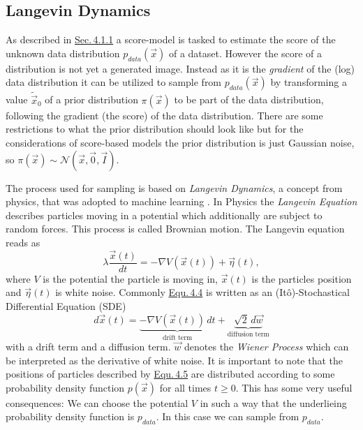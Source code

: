 \subsection{Langevin Dynamics} \label{sec:4.1.2}
As described in \hyperref[sec:4.1.1]{Sec.\,4.1.1} a score-model is tasked to estimate the score of the unknown data distribution $p_{data}(\vec{x})$ of a dataset. However the score of a distribution is not yet a generated image. Instead as it is the \textit{gradient} of the (log) data distribution it can be utilized to sample from $p_{data}(\vec{x})$ by transforming a value $\tilde{\vec{x}}_0$ of a prior distribution $\pi(\vec{x})$ to be part of the data distribution, following the gradient (the score) of the data distribution. There are some restrictions to what the prior distribution should look like but for the considerations of score-based models the prior distribution is just Gaussian noise, so $\pi(\vec{x})\sim\mathcal{N}(\vec{x}, \vec{0}, \vec{I})$.

The process used for sampling is based on \textit{Langevin Dynamics}, a concept from physics, that was adopted to machine learning \cite{langevin1, langevin2}. In Physics the \textit{Langevin Equation} describes particles moving in a potential which additionally are subject to random forces. This process is called Brownian motion. The Langevin equation reads as 
%
\begin{equation} \label{equ:4.4}
    \lambda \frac{\vec{x}(t)}{dt}=-\nabla V(\vec{x}(t))+\vec{\eta}(t),
\end{equation}
%
where $V$ is the potential the particle is moving in, $\vec{x}(t)$ is the particles position and $\vec{\eta}(t)$ is white noise. Commonly \hyperref[equ:4.4]{Equ.\,4.4} is written as an (Itô)-Stochastical Differential Equation (SDE)
%
\begin{equation} \label{equ:4.5}
    d\vec{x}(t)=\underbrace{-\nabla V(\vec{x}(t))\,dt}_\text{drift term}+\underbrace{\sqrt{2}\,d\vec{w}}_\text{diffusion term}
\end{equation}
%
with a drift term and a diffusion term. $\vec{w}$ denotes the \textit{Wiener Process} which can be interpreted as the derivative of white noise. It is important to note that the positions of particles described by \hyperref[equ:4.5]{Equ.\,4.5} are distributed according to some probability density function $p(\vec{x})$ for all times $t\geq0$. This has some very useful consequences: We can choose the potential $V$ in such a way that the underlieing probability density function is $p_{data}$. In this case we can sample from $p_{data}$.

